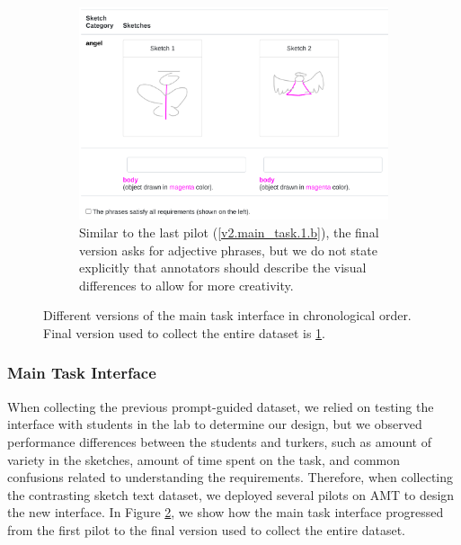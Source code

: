 \begin{figure}[!htb]
\ContinuedFloat
\begin{subfigure}{\textwidth}
\centering
\includegraphics[width=.8\linewidth]{data_collection/version2/v2anno.png}  
\caption{Similar to the last pilot (\ref{v2.main_task.1.b}), the final version asks for adjective phrases, but we do not state explicitly that annotators should describe the visual differences to allow for more creativity.}
\label{v2.main_task.1.d}
\end{subfigure}
\caption{Different versions of the main task interface in chronological order. Final version used to collect the entire dataset is \ref{v2.main_task.1.d}.}
\label{v2.main_task.1}
\end{figure}



\subsubsection{Main Task Interface}
When collecting the previous prompt-guided dataset, we relied on testing the interface with students in the lab to determine our design, but we observed performance differences between the students and turkers, such as amount of variety in the sketches, amount of time spent on the task, and common confusions related to understanding the requirements. 
Therefore, when collecting the contrasting sketch text dataset, we deployed several pilots on AMT to design the new interface.  
In Figure \ref{v2.main_task.1}, we show how the main task interface progressed from the first pilot to the final version used to collect the entire dataset. 

